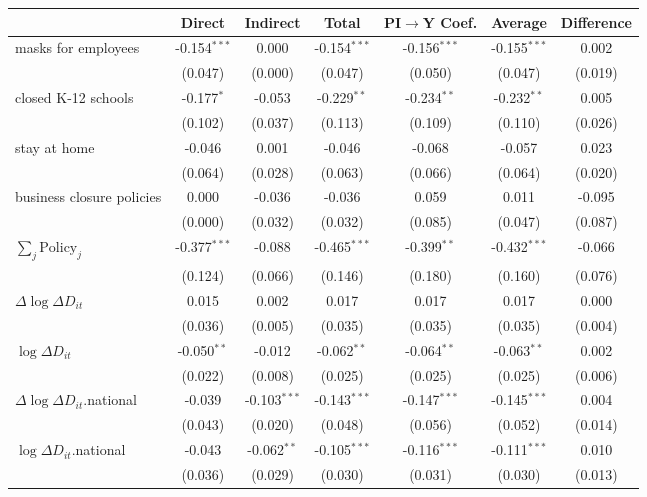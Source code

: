
\begin{tabular}{lccccc|>{}c}
\toprule
  & Direct & Indirect & Total & PI$\to$Y Coef. & Average & Difference\\
\midrule
masks for employees & -0.154$^{***}$ & 0.000 & -0.154$^{***}$ & -0.156$^{***}$ & -0.155$^{***}$ & 0.002\\
 & (0.047) & (0.000) & (0.047) & (0.050) & (0.047) & (0.019)\\
closed K-12 schools & -0.177$^{*}$ & -0.053 & -0.229$^{**}$ & -0.234$^{**}$ & -0.232$^{**}$ & 0.005\\
 & (0.102) & (0.037) & (0.113) & (0.109) & (0.110) & (0.026)\\
stay at home & -0.046 & 0.001 & -0.046 & -0.068 & -0.057 & 0.023\\
 & (0.064) & (0.028) & (0.063) & (0.066) & (0.064) & (0.020)\\
business closure policies & 0.000 & -0.036 & -0.036 & 0.059 & 0.011 & -0.095\\
 & (0.000) & (0.032) & (0.032) & (0.085) & (0.047) & (0.087)\\
$\sum_j \mathrm{Policy}_j$ & -0.377$^{***}$ & -0.088 & -0.465$^{***}$ & -0.399$^{**}$ & -0.432$^{***}$ & -0.066\\
 & (0.124) & (0.066) & (0.146) & (0.180) & (0.160) & (0.076)\\
$\Delta \log \Delta D_{it}$ & 0.015 & 0.002 & 0.017 & 0.017 & 0.017 & 0.000\\
 & (0.036) & (0.005) & (0.035) & (0.035) & (0.035) & (0.004)\\
$\log \Delta D_{it}$ & -0.050$^{**}$ & -0.012 & -0.062$^{**}$ & -0.064$^{**}$ & -0.063$^{**}$ & 0.002\\
 & (0.022) & (0.008) & (0.025) & (0.025) & (0.025) & (0.006)\\
$\Delta \log \Delta D_{it}$.national & -0.039 & -0.103$^{***}$ & -0.143$^{***}$ & -0.147$^{***}$ & -0.145$^{***}$ & 0.004\\
 & (0.043) & (0.020) & (0.048) & (0.056) & (0.052) & (0.014)\\
$\log \Delta D_{it}$.national & -0.043 & -0.062$^{**}$ & -0.105$^{***}$ & -0.116$^{***}$ & -0.111$^{***}$ & 0.010\\
 & (0.036) & (0.029) & (0.030) & (0.031) & (0.030) & (0.013)\\
\bottomrule
\end{tabular}